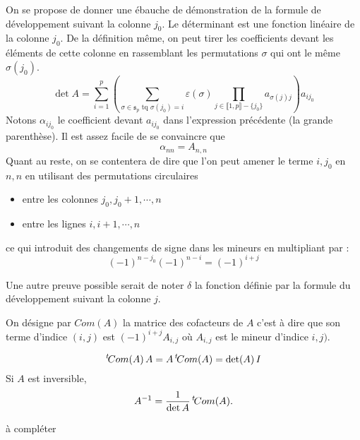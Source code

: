 \begin{demo}
On se propose de donner une ébauche de démonstration de la formule de développement suivant la colonne $j_0$.\newline
Le déterminant est une fonction linéaire de la colonne $j_0$. De la définition même, on peut tirer les coefficients devant les éléments de cette colonne en rassemblant les permutations $\sigma$ qui ont le même $\sigma(j_0)$.
 \begin{displaymath}
 \det A =
\sum_{i=1}^p
\left( \sum_{
 \sigma \in \mathfrak s_p \text{ tq } \sigma(j_0)=i
}\varepsilon(\sigma)\prod_{j\in \llbracket 1, p \rrbracket-\{j_0\}}a_{\sigma(j)j}\right) a_{ij_0}
\end{displaymath}
Notons $\alpha_{ij_0}$ le coefficient devant $a_{ij_0}$ dans l'expression précédente (la grande parenthèse). Il est assez facile de se convaincre que 
\begin{displaymath}
\alpha_{nn} = A_{n,n} 
\end{displaymath}
Quant au reste, on se contentera de dire que l'on peut amener le terme $i,j_0$ en $n,n$ en utilisant des permutations circulaires
\begin{itemize}
 \item entre les colonnes $j_0,j_0+1,\cdots,n$
\item entre les lignes $i,i+1,\cdots,n$
\end{itemize}
ce qui introduit des changements de signe dans les mineurs en multipliant par :
\begin{displaymath}
 (-1)^{n-j_0}(-1)^{n-i}=(-1)^{i+j}
\end{displaymath}

Une autre preuve possible serait de noter $\delta$ la fonction définie par la formule du développement suivant la colonne $j$.
\end{demo}
\clearpage
{}
\begin{defi}
On désigne par $Com(A)$ la matrice des cofacteurs de $A$ c'est à dire que son terme d'indice $(i,j)$ est $(-1)^{i+j}A_{i,j}$ où $A_{i,j}$ est le mineur d'indice $i,j)$. 
\end{defi}
\begin{propn}
 \begin{displaymath}
  \mathstrut^t\! Com(A)\,A = A\, \mathstrut^t\! Com(A) = \det(A)\,I
 \end{displaymath}
Si $A$ est inversible,
\[
  A^{-1} = \frac{1}{\det A}\, \mathstrut^t\! Com(A). 
\]
\end{propn}
\begin{demo}
  à compléter
\end{demo}
\clearpage
